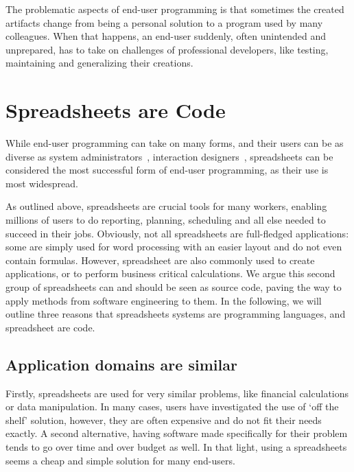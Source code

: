 \documentclass[conference]{IEEEtran}
\begin{document}
The problematic aspects of end-user programming is that sometimes the created artifacts change from being a personal solution to a program used by many colleagues. When that happens, an end-user suddenly, often unintended and unprepared, has to take on challenges of professional developers, like testing, maintaining and generalizing their creations. 


\section{Spreadsheets are Code}
While end-user programming can take on many forms, and their users can be as diverse as system administrators~\cite{Barrett2004}, interaction designers~\cite{Ko2004, brandt_opportunistic_2008, myers_how_2008}, spreadsheets can be considered the most successful form of end-user programming, as their use is most widespread.

As outlined above, spreadsheets are crucial tools for many workers, enabling millions of users to do reporting, planning, scheduling and all else needed to succeed in their jobs. Obviously, not all spreadsheets are full-fledged applications: some are simply used for word processing with an easier layout and do not even contain formulas. However, spreadsheet are also commonly used to create applications, or to perform business critical calculations. We argue this second group of spreadsheets can and should be seen as source code, paving the way to apply methods from software engineering to them. In the following, we will outline three reasons that spreadsheets systems are programming languages, and spreadsheet are code.

\subsection{Application domains are similar}
Firstly, spreadsheets are used for very similar problems, like financial calculations or data manipulation. In many cases, users have investigated the use of ‘off the shelf’ solution, however, they are often expensive and do not fit their needs exactly. A second alternative, having software made specifically for their problem tends to go over time and over budget as well. In that light, using a spreadsheets seems a cheap and simple solution for many end-users.
\end{document}
